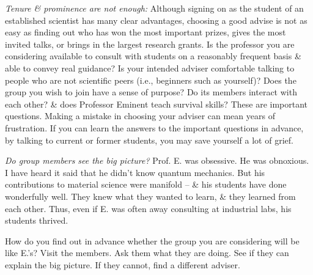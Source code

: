 \documentclass{article}
\begin{document}
\begin{enumerate}
\begin{itemize}
\begin{itemize}
			\textit{Tenure \& prominence are not enough:} Although signing on as the student of an established scientist has many clear advantages, choosing a good advise is not as easy as finding out who has won the most important prizes, gives the most invited talks, or brings in the largest research grants. Is the professor you are considering available to consult with students on a reasonably frequent basis \& able to convey real guidance? Is your intended adviser comfortable talking to people who are not scientific peers (i.e., beginners such as yourself)? Does the group you wish to join have a sense of purpose? Do its members interact with each other? \& does Professor Eminent teach survival skills? These are important questions. Making a mistake in choosing your adviser can mean years of frustration. If you can learn the answers to the important questions in advance, by talking to current or former students, you may save yourself a lot of grief.

			\textit{Do group members see the big picture?} Prof. E. was obsessive. He was obnoxious. I have heard it said that he didn't know quantum mechanics. But his contributions to material science were manifold -- \& his students have done wonderfully well. They knew what they wanted to learn, \& they learned from each other. Thus, even if E. was often away consulting at industrial labs, his students thrived.

			How do you find out in advance whether the group you are considering will be like E.'s? Visit the members. Ask them what they are doing. See if they can explain the big picture. If they cannot, find a different adviser.


\end{itemize}
\end{itemize}
\end{enumerate}
\end{document}

